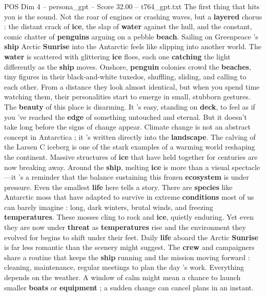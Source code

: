\begin{textsample}{POS Dim 4 – persona\_gpt – Score 32.00 – t764\_gpt.txt}  \label{ex:f4_pos_021}
The first thing that hits you is the sound.
Not the roar of engines or crashing waves, but a \textbf{layered} chorus : the distant crack of \textbf{ice}, the slap of \textbf{water} against the hull, and the constant, comic chatter of \textbf{penguins} arguing on a pebble \textbf{beach}.
Sailing on Greenpeace ’s \textbf{ship} Arctic \textbf{Sunrise} into the Antarctic feels like slipping into another world.
The \textbf{water} is scattered with glittering \textbf{ice} floes, each one \textbf{catching} the light differently as the \textbf{ship} moves.
Onshore, \textbf{penguin} colonies crowd the \textbf{beaches}, tiny figures in their black-and-white tuxedos, shuffling, sliding, and calling to each other.
From a distance they look almost identical, but when you spend time watching them, their personalities start to emerge in small, stubborn gestures.
The \textbf{beauty} of this place is disarming.
It ’s easy, standing on \textbf{deck}, to feel as if you ’ve reached the \textbf{edge} of something untouched and eternal.
But it doesn't take long before the signs of change appear.
Climate change is not an abstract concept in Antarctica ; it ’s written directly into the \textbf{landscape}.
The calving of the Larsen C iceberg is one of the stark examples of a warming world reshaping the continent.
Massive structures of \textbf{ice} that have held together for centuries are now breaking away.
Around the \textbf{ship}, melting \textbf{ice} is more than a visual spectacle—it ’s a reminder that the balance sustaining this frozen \textbf{ecosystem} is under pressure.
Even the smallest \textbf{life} here tells a story.
There are \textbf{species} like Antarctic moss that have adapted to survive in extreme \textbf{conditions} most of us can barely imagine : long, dark winters, brutal winds, and freezing \textbf{temperatures}.
These mosses cling to rock and \textbf{ice}, quietly enduring.
Yet even they are now under \textbf{threat} as \textbf{temperatures} rise and the environment they evolved for begins to shift under their feet.
Daily \textbf{life} aboard the Arctic \textbf{Sunrise} is far less romantic than the scenery might suggest.
The \textbf{crew} and campaigners share a routine that keeps the \textbf{ship} running and the mission moving forward : cleaning, maintenance, regular meetings to plan the day ’s work.
Everything depends on the weather.
A window of calm might mean a chance to launch smaller \textbf{boats} or \textbf{equipment} ; a sudden change can cancel plans in an instant.

\end{textsample}
